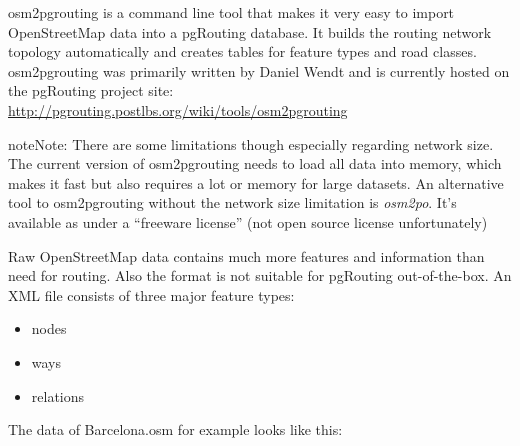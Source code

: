 \documentclass[a4paper,10pt,english]{manual}
\begin{document}
osm2pgrouting is a command line tool that makes it very easy to import OpenStreetMap data into a pgRouting database. It builds the routing network topology automatically and creates tables for feature types and road classes. osm2pgrouting was primarily written by Daniel Wendt and is currently hosted on the pgRouting project site: \href{http://pgrouting.postlbs.org/wiki/tools/osm2pgrouting}{http://pgrouting.postlbs.org/wiki/tools/osm2pgrouting}

\begin{notice}{note}{Note:}
There are some limitations though especially regarding network size. The current version of osm2pgrouting needs to load all data into memory, which makes it fast but also requires a lot or memory for large datasets. An alternative tool to osm2pgrouting without the network size limitation is \emph{osm2po}. It's available as under a ``freeware license'' (not open source license unfortunately)
\end{notice}

Raw OpenStreetMap data contains much more features and information than need for routing. Also the format is not suitable for pgRouting out-of-the-box. An  XML file consists of three major feature types:
\begin{itemize}
\item {} 
nodes

\item {} 
ways

\item {} 
relations

\end{itemize}

The data of Barcelona.osm for example looks like this:
\end{document}
